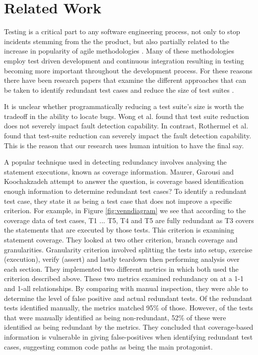 \chapter{Related Work}\label{C:related}

Testing is a critical part to any software engineering process, not only to stop incidents stemming from the the product, but also partially related to the increase in popularity of agile methodologies \cite{chaos}. Many of these methodologies employ test driven development and continuous integration resulting in testing becoming more important throughout the development process. For these reasons there have been research papers that examine the different approaches that can be taken to identify redundant test cases and reduce the size of test suites \cite{wong1995effect, wong1999test, rothermel1998empirical, rothermel2002empirical,koochakzadeh2009test,zhang2011empirical,li2008static}.

It is unclear whether programmatically reducing a test suite's size is worth the tradeoff in the ability to locate bugs.  Wong et al. \cite{wong1995effect, wong1999test} found that test suite reduction does not severely impact fault detection capability. In contrast, Rothermel et al. \cite{rothermel1998empirical, rothermel2002empirical} found that test-suite reduction can severely impact the fault detection capability. This is the reason that our research uses human intuition to have the final say.

A popular technique used in detecting redundancy involves analysing the statement executions, known as coverage information. Maurer, Garousi and Koochakzadeh \cite{koochakzadeh2009test} attempt to answer the question, is coverage based identification enough information to determine redundant test cases? To identify a redundant test case, they state it as being a test case that does not improve a specific criterion. For example, in Figure \ref{fig:venndiagram} we see that according to the coverage data of test cases, T1 ... T5, T4 and T5 are fully redundant as T3 covers the statements that are executed by those tests. This criterion is examining statement coverage. They looked at two other criterion, branch coverage and granularities. Granularity criterion involved splitting the tests into setup, exercise (execution), verify (assert) and lastly teardown then performing analysis over each section. They implemented two different metrics in which both used the criterion described above. These two metrics examined redundancy on at a 1-1 and 1-all relationships. By comparing with manual inspection, they were able to determine the level of false positive and actual redundant tests. Of the redundant tests identified manually, the metrics matched 95\% of those. However, of the tests that were manually identified as being non-redundant, 52\% of these were identified as being redundant by the metrics. They concluded that coverage-based information is vulnerable in giving false-positives when identifying redundant test cases, suggesting common code paths as being the main protagonist. 

